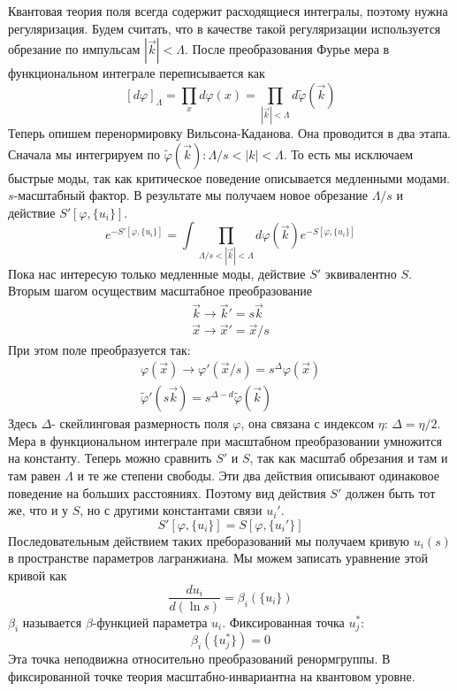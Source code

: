 \documentclass[a4paper,12pt]{article} \usepackage[utf8x]{inputenc} \usepackage[russian]{babel}
\theoremstyle{definition} \newtheorem{corollary}{Corollary}[theorem] \theoremstyle{definition}
\begin{document}
Квантовая теория поля всегда содержит расходящиеся интегралы, поэтому нужна регуляризация. Будем
считать, что в качестве такой регуляризации используется обрезание по импульсам $\left|\vec
k\right|<\Lambda$. После преобразования Фурье мера в функциональном интеграле переписывается как
\begin{equation}
  \label{eq:66} [d\varphi]_{\Lambda}=\prod_x d\varphi(x)=\prod_{\left|\vec
k\right|<\Lambda}d\tilde\varphi(\vec k)
\end{equation} Теперь опишем перенормировку Вильсона-Каданова. Она проводится в два этапа. Сначала
мы интегрируем по $\tilde\varphi(\vec k): \Lambda/s<\left|k\right|<\Lambda$. То есть мы исключаем
быстрые моды, так как критическое поведение описывается медленными модами. $s$-масштабный фактор. В
результате мы получаем новое обрезание $\Lambda/s$ и действие $S'[\varphi,\{u_i\}]$.
\begin{equation}
  \label{eq:67} e^{-S'[\varphi,\{u_i\}]}=\int \prod_{\Lambda/s<\left|\vec
k\right|<\Lambda}d\varphi(\vec k)e^{-S[\varphi,\{u_i\}]}
\end{equation} Пока нас интересую только медленные моды, действие $S'$ эквивалентно $S$. Вторым
шагом осуществим масштабное преобразование
\begin{eqnarray}
  \label{eq:68} \vec k \to \vec k'=s \vec k\\ \vec x\to \vec x'=\vec x/s
\end{eqnarray} При этом поле преобразуется так:
\begin{eqnarray}
  \label{eq:69} \varphi(\vec x)\to \varphi'(\vec x/s)=s^{\Delta}\varphi (\vec x)\\
\tilde\varphi'(s\vec k)=s^{\Delta-d}\tilde\varphi (\vec k)
\end{eqnarray} Здесь $\Delta$- скейлинговая размерность поля $\varphi$, она связана с индексом
$\eta$: $\Delta=\eta/2$. Мера в функциональном интеграле при масштабном преобразовании умножится на
константу. Теперь можно сравнить $S'$ и $S$, так как масштаб обрезания и там и там равен $\Lambda$ и
те же степени свободы. Эти два действия описывают одинаковое поведение на больших расстояниях.
Поэтому вид действия $S'$ должен быть тот же, что и у $S$, но с другими константами связи $u_i'$.
\begin{equation}
  \label{eq:70} S'[\varphi,\{u_i\}]=S[\varphi,\{u_i'\}]
\end{equation} Последовательным действием таких преборазований мы получаем кривую $u_i(s)$ в
пространстве параметров лагранжиана. Мы можем записать уравнение этой кривой как
\begin{equation}
  \label{eq:71} \frac{du_i}{d(\ln s)}=\beta_i(\{u_i\})
\end{equation} $\beta_i$ называется $\beta$-функцией параметра $u_i$. Фиксированная точка $u_j^{*}$:
\begin{equation}
  \label{eq:72} \beta_i(\{u^{*}_j\})=0
\end{equation} Эта точка неподвижна относительно преобразований ренормгруппы. В фиксированной точке
теория масштабно-инвариантна на квантовом уровне.
\end{document}
